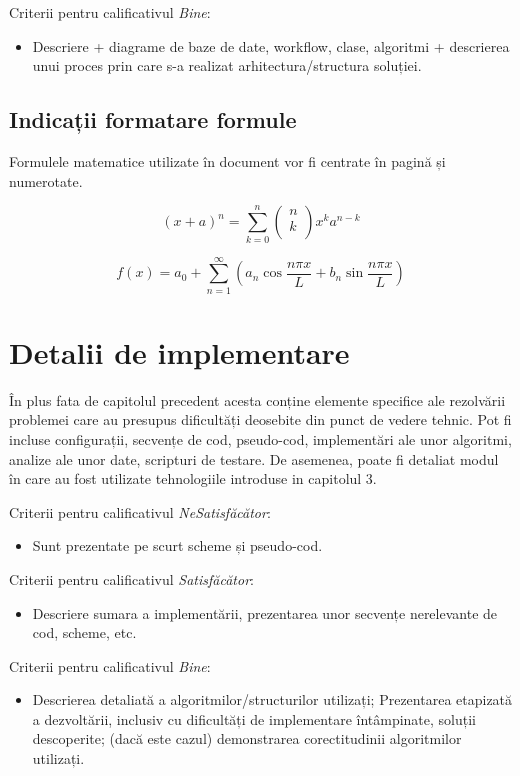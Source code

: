 Criterii pentru calificativul \textit{Bine}: 
\begin{itemize}
	\item 	Descriere + diagrame de baze de date, workflow, clase, algoritmi + descrierea unui proces prin care s-a realizat arhitectura/structura soluției.
\end{itemize}

\section{Indicații formatare formule}
Formulele matematice utilizate în document vor fi centrate în pagină și numerotate. 

\begin{equation}
(x+a)^n = \sum_{k=0}^{n}\left(\begin{array}{c}n\\k\\\end{array}\right)x^ka^{n-k}
\end{equation}

\begin{equation}
f(x) = a_0 + \sum_{n=1}^{\infty}\left(a_n \cos\frac{n\pi x}{L} + b_n\sin\frac{n\pi x}{L}\right)
\end{equation}



\chapter{Detalii de implementare}
În plus fata de capitolul precedent acesta conține elemente specifice ale rezolvării problemei care au presupus dificultăți deosebite din punct de vedere tehnic. Pot fi incluse configurații, secvențe de cod, pseudo-cod, implementări ale unor algoritmi, analize ale unor date, scripturi de testare. De asemenea, poate fi detaliat modul în care au fost utilizate tehnologiile introduse in capitolul 3.


Criterii pentru calificativul \textit{Ne\textit{Satisfăcător}}: 
\begin{itemize}
	\item	Sunt prezentate pe scurt scheme și pseudo-cod.
\end{itemize}
Criterii pentru calificativul \textit{Satisfăcător}: 
\begin{itemize}
	\item	Descriere sumara a implementării, prezentarea unor secvențe nerelevante de cod, scheme, etc. 
\end{itemize}
Criterii pentru calificativul \textit{Bine}: 
\begin{itemize}
	\item	Descrierea detaliată a algoritmilor/structurilor utilizați; Prezentarea etapizată a dezvoltării, inclusiv cu dificultăți de implementare întâmpinate, soluții descoperite; (dacă este cazul) demonstrarea corectitudinii algoritmilor utilizați. 
\end{itemize}

